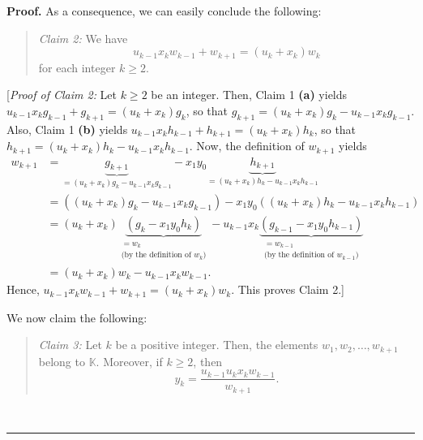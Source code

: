 \documentclass[numbers=enddot,12pt,final,onecolumn,notitlepage]{scrartcl}%
\theoremstyle{definition}
\newenvironment{statement}{\begin{quote}}{\end{quote}}
\newenvironment{proof}[1][Proof]{\noindent\textbf{#1.} }{\ \rule{0.5em}{0.5em}}
\newenvironment{verlong}{}{}
\begin{document}
\begin{verlong}
\begin{proof}
As a consequence, we can easily conclude the following:

\begin{statement}
\textit{Claim 2:} We have
\begin{equation}
u_{k-1}x_{k}w_{k-1}+w_{k+1}=\left(  u_{k}+x_{k}\right)  w_{k}
\label{pf.prop.unique.c.Qplus.c3.1}%
\end{equation}
for each integer $k\geq2$.
\end{statement}

[\textit{Proof of Claim 2:} Let $k\geq2$ be an integer. Then, Claim 1
\textbf{(a)} yields $u_{k-1}x_{k}g_{k-1}+g_{k+1}=\left(  u_{k}+x_{k}\right)
g_{k}$, so that $g_{k+1}=\left(  u_{k}+x_{k}\right)  g_{k}-u_{k-1}x_{k}%
g_{k-1}$. Also, Claim 1 \textbf{(b)} yields $u_{k-1}x_{k}h_{k-1}%
+h_{k+1}=\left(  u_{k}+x_{k}\right)  h_{k}$, so that $h_{k+1}=\left(
u_{k}+x_{k}\right)  h_{k}-u_{k-1}x_{k}h_{k-1}$. Now, the definition of
$w_{k+1}$ yields%
\begin{align*}
w_{k+1}  &  =\underbrace{g_{k+1}}_{=\left(  u_{k}+x_{k}\right)  g_{k}%
-u_{k-1}x_{k}g_{k-1}}-x_{1}y_{0}\underbrace{h_{k+1}}_{=\left(  u_{k}%
+x_{k}\right)  h_{k}-u_{k-1}x_{k}h_{k-1}}\\
&  =\left(  \left(  u_{k}+x_{k}\right)  g_{k}-u_{k-1}x_{k}g_{k-1}\right)
-x_{1}y_{0}\left(  \left(  u_{k}+x_{k}\right)  h_{k}-u_{k-1}x_{k}%
h_{k-1}\right) \\
&  =\left(  u_{k}+x_{k}\right)  \underbrace{\left(  g_{k}-x_{1}y_{0}%
h_{k}\right)  }_{\substack{=w_{k}\\\text{(by the definition of }w_{k}\text{)}%
}}-u_{k-1}x_{k}\underbrace{\left(  g_{k-1}-x_{1}y_{0}h_{k-1}\right)
}_{\substack{=w_{k-1}\\\text{(by the definition of }w_{k-1}\text{)}}}\\
&  =\left(  u_{k}+x_{k}\right)  w_{k}-u_{k-1}x_{k}w_{k-1}.
\end{align*}
Hence, $u_{k-1}x_{k}w_{k-1}+w_{k+1}=\left(  u_{k}+x_{k}\right)  w_{k}$. This
proves Claim 2.]

We now claim the following:

\begin{statement}
\textit{Claim 3:} Let $k$ be a positive integer. Then, the elements
$w_{1},w_{2},\ldots,w_{k+1}$ belong to $\mathbb{K}$. Moreover, if $k\geq2$,
then%
\begin{equation}
y_{k}=\dfrac{u_{k-1}u_{k}x_{k}w_{k-1}}{w_{k+1}}.
\label{pf.prop.unique.c.Qplus.c3.2}%
\end{equation}


\end{statement}
\end{proof}
\end{verlong}
\end{document}
